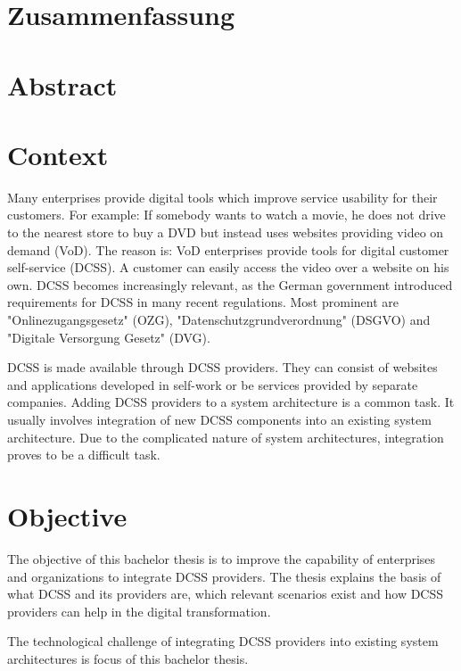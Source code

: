 \documentclass[
     12pt,         %
     a4paper,      %
     BCOR10mm,     %
     DIV14,        %
aragraph skip instad of paragraph indent
     ]{scrreprt}
\begin{document}
\chapter*{Zusammenfassung}

\newpage

\chapter*{Abstract}

\newpage

\tableofcontents
\cleardoublepage
{}

\chapter{Context}

Many enterprises provide digital tools which improve service usability for their customers. For example: If somebody wants to watch a movie, he does not drive to the nearest store to buy a DVD but instead uses websites providing video on demand (VoD). The reason is: VoD enterprises provide tools for digital customer self-service (DCSS). A customer can easily access the video over a website on his own. DCSS becomes increasingly relevant, as the German government introduced requirements for DCSS in many recent regulations. Most prominent are  "Onlinezugangsgesetz" (OZG), "Datenschutzgrundverordnung" (DSGVO) and "Digitale Versorgung Gesetz" (DVG). 

DCSS is made available through DCSS providers. They can consist of websites and applications developed in self-work or be services provided by separate companies. Adding DCSS providers to a system architecture is a common task. It usually involves integration of new DCSS components into an existing system architecture. Due to the complicated nature of system architectures, integration proves to be a difficult task.

\chapter{Objective}

The objective of this bachelor thesis is to improve the capability of enterprises and organizations to integrate DCSS providers. The thesis explains the basis of what DCSS and its providers are, which relevant scenarios exist and how DCSS providers can help in the digital transformation.

The technological challenge of integrating DCSS providers into existing system architectures is focus of this bachelor thesis.
\end{document}
